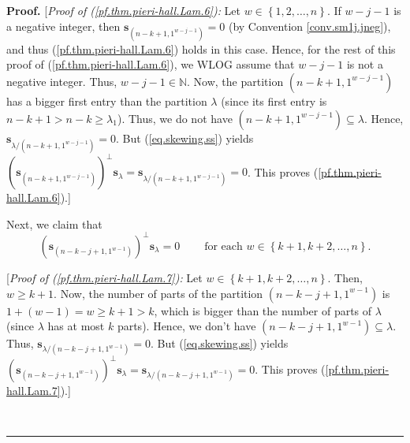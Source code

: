 \documentclass[numbers=enddot,12pt,final,onecolumn,notitlepage]{scrartcl}%
\theoremstyle{definition}
\newenvironment{proof}[1][Proof]{\noindent\textbf{#1.} }{\ \rule{0.5em}{0.5em}}
\begin{document}
\begin{proof}
[\textit{Proof of (\ref{pf.thm.pieri-hall.Lam.6}):} Let $w\in\left\{
1,2,\ldots,n\right\}  $. If $w-j-1$ is a negative integer, then $\mathbf{s}%
_{\left(  n-k+1,1^{w-j-1}\right)  }=0$ (by Convention \ref{conv.sm1j.jneg}),
and thus (\ref{pf.thm.pieri-hall.Lam.6}) holds in this case. Hence, for the
rest of this proof of (\ref{pf.thm.pieri-hall.Lam.6}), we WLOG assume that
$w-j-1$ is not a negative integer. Thus, $w-j-1\in\mathbb{N}$. Now, the
partition $\left(  n-k+1,1^{w-j-1}\right)  $ has a bigger first entry than the
partition $\lambda$ (since its first entry is $n-k+1>n-k\geq\lambda_{1}$).
Thus, we do not have $\left(  n-k+1,1^{w-j-1}\right)  \subseteq\lambda$.
Hence, $\mathbf{s}_{\lambda/\left(  n-k+1,1^{w-j-1}\right)  }=0$. But
(\ref{eq.skewing.ss}) yields $\left(  \mathbf{s}_{\left(  n-k+1,1^{w-j-1}%
\right)  }\right)  ^{\perp}\mathbf{s}_{\lambda}=\mathbf{s}_{\lambda/\left(
n-k+1,1^{w-j-1}\right)  }=0$. This proves (\ref{pf.thm.pieri-hall.Lam.6}).]

Next, we claim that%
\begin{equation}
\left(  \mathbf{s}_{\left(  n-k-j+1,1^{w-1}\right)  }\right)  ^{\perp
}\mathbf{s}_{\lambda}=0\ \ \ \ \ \ \ \ \ \ \text{for each }w\in\left\{
k+1,k+2,\ldots,n\right\}  . \label{pf.thm.pieri-hall.Lam.7}%
\end{equation}


[\textit{Proof of (\ref{pf.thm.pieri-hall.Lam.7}):} Let $w\in\left\{
k+1,k+2,\ldots,n\right\}  $. Then, $w\geq k+1$. Now, the number of parts of
the partition $\left(  n-k-j+1,1^{w-1}\right)  $ is $1+\left(  w-1\right)
=w\geq k+1>k$, which is bigger than the number of parts of $\lambda$ (since
$\lambda$ has at most $k$ parts). Hence, we don't have $\left(
n-k-j+1,1^{w-1}\right)  \subseteq\lambda$. Thus, $\mathbf{s}_{\lambda/\left(
n-k-j+1,1^{w-1}\right)  }=0$. But (\ref{eq.skewing.ss}) yields $\left(
\mathbf{s}_{\left(  n-k-j+1,1^{w-1}\right)  }\right)  ^{\perp}\mathbf{s}%
_{\lambda}=\mathbf{s}_{\lambda/\left(  n-k-j+1,1^{w-1}\right)  }=0$. This
proves (\ref{pf.thm.pieri-hall.Lam.7}).]


\end{proof}
\end{document}
